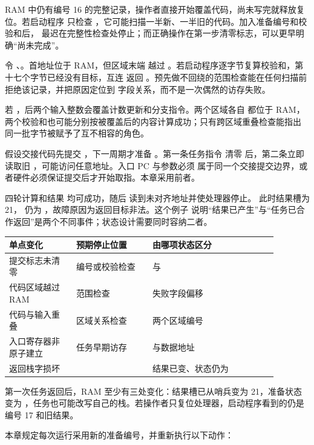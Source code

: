 RAM 中仍有编号 16 的完整记录，操作者直接开始覆盖代码，尚未写完就释放复位。若启动程序
只检查 ，它可能扫描一半新、一半旧的代码。加入准备编号和校验和后，
最迟在完整性检查处停止；而正确操作在第一步清零标志，可以更早明确“尚未完成”。


令 、。首地址位于 RAM，但区域末端
越过 。若启动程序逐字节复算校验和，第十七个字节已经没有目标，互连
返回 。预先做不回绕的范围检查能在任何扫描前拒绝该记录，并把原因定位到
字段关系，而不是一次偶然的访存失败。


若 ，后两个输入整数会覆盖计数更新和分支指令。两个区域各自
都位于 RAM，两个校验和也可能分别按被覆盖后的内容计算成功；只有跨区域重叠检查能指出
同一批字节被赋予了互不相容的角色。


假设交接代码先提交 ，下一周期才准备 。第一条任务指令
清零  后，第二条立即读取旧 ，可能访问任意地址。入口 PC 与参数必须
属于同一个交接提交边界，或者硬件必须保证提交后才开始取指。本章采用前者。


四轮计算和结果  均可成功，随后  读到未对齐地址并使处理器停止。
此时结果槽为 21， 仍为 ，故障原因为返回目标非法。这个例子
说明“结果已产生”与“任务已合作返回”是两个不同事件；状态设计需要同时容纳二者。

\begin{longtable}{|L{0.22\linewidth}|L{0.25\linewidth}|L{0.41\linewidth}|}
\hline
{}
单点变化 & 预期停止位置 & 由哪项状态区分 \\ \hline
提交标志未清零 & 编号或校验检查 &  与  \\ \hline
代码区域越过 RAM & 范围检查 & 失败字段偏移 \\ \hline
代码与输入重叠 & 区域关系检查 & 两个区域编号 \\ \hline
入口寄存器非原子建立 & 任务早期访存 &  与数据地址 \\ \hline
返回栈字损坏 &  & 结果已变、状态仍为  \\ \hline
\end{longtable}


第一次任务返回后，RAM 至少有三处变化：结果槽已从哨兵变为 21，准备状态变为
，任务也可能改写自己的栈。若操作者只复位处理器，启动程序看到的仍是
编号 17 和旧结果。

本章规定每次运行采用新的准备编号，并重新执行以下动作：

